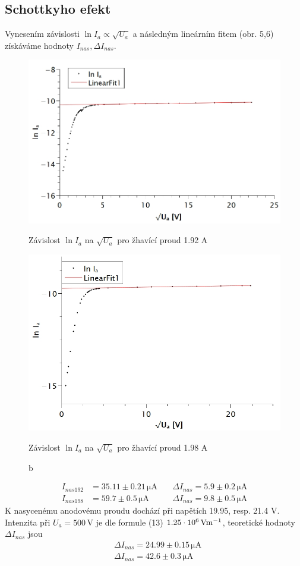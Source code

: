 \documentclass[czech,11pt,a4paper]{article}
\begin{document}
\begin{multicols}{2}
		\subsection{Schottkyho efekt}
		Vynesením závislosti $\ln I_a \propto \sqrt{U_a}$ a následným lineárním fitem (obr. 5,6) získáváme hodnoty $I_{nas}, \Delta I_{nas}$.
		\begin{figure}[H]
			\centering
			\includegraphics[width=0.7\linewidth]{192lnsq}
			\caption{Závislost $\ln I_a$ na $\sqrt{U_a}$ pro žhavící proud 1.92 A}
			\includegraphics[width=0.7\linewidth]{198lnsq}
			\caption{Závislost $\ln I_a$ na $\sqrt{U_a}$ pro žhavící proud 1.98 A}
			\caption{b}
		\end{figure}\begin{align*}
			I_{nas192} &=  35.11 \pm 0.21 \,\mathrm{\mu A} \quad &\Delta I_{nas} =5.9 \pm 0.2 \,\mathrm{\mu A}\\
			I_{nas198} &=  59.7 \pm 0.5 \,\mathrm{\mu A}	\quad &\Delta I_{nas} = 9.8 \pm 0.5 \,\mathrm{\mu A}
		\end{align*}
		K nasycenému anodovému proudu dochází při napětích 19.95, resp. 21.4 V. Intenzita při $U_a = 500 \,\mathrm{V}$ je dle formule (13) $1.25\cdot10^6\,\rm Vm^{-1}$, teoretické hodnoty $\Delta I_{nas}$ jsou
		\begin{align*}
		&\Delta I_{nas} =24.99 \pm 0.15 \,\mathrm{\mu A}\\
		&\Delta I_{nas} = 42.6 \pm 0.3 \,\mathrm{\mu A}
		\end{align*} \newpage

\end{multicols}
\end{document}

